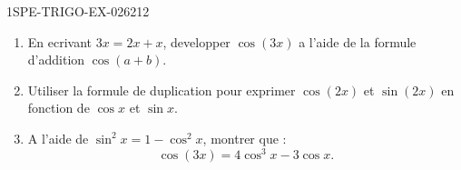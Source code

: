 \begin{exercice}{1SPE-TRIGO-EX-026}{2}{12}
\begin{enumerate}
  \item En ecrivant $3x = 2x + x$, developper $\cos(3x)$ a l'aide de la formule d'addition $\cos(a+b)$.
  \item Utiliser la formule de duplication pour exprimer $\cos(2x)$ et $\sin(2x)$ en fonction de $\cos x$ et $\sin x$.
  \item A l'aide de $\sin^2 x = 1 - \cos^2 x$, montrer que :
  \[
    \cos(3x) = 4\cos^3 x - 3\cos x.
  \]
\end{enumerate}
\end{exercice}
